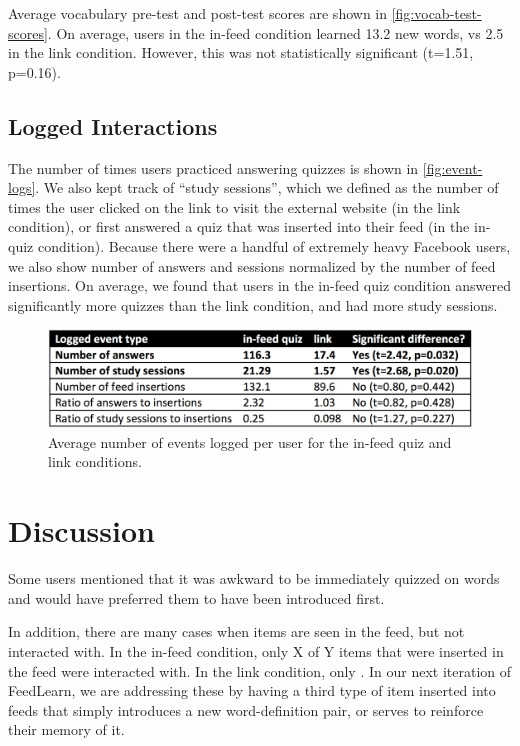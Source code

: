 \documentclass{chi-ext}
\begin{document}
Average vocabulary pre-test and post-test scores are shown in \autoref{fig:vocab-test-scores}. On average, users in the in-feed condition learned 13.2 new words, vs 2.5 in the link condition. However, this was not statistically significant (t=1.51, p=0.16).

\subsection{Logged Interactions}

The number of times users practiced answering quizzes is shown in \autoref{fig:event-logs}. We also kept track of ``study sessions'', which we defined as the number of times the user clicked on the link to visit the external website (in the link condition), or first answered a quiz that was inserted into their feed (in the in-quiz condition). Because there were a handful of extremely heavy Facebook users, we also show number of answers and sessions normalized by the number of feed insertions. On average, we found that users in the in-feed quiz condition answered significantly more quizzes than the link condition, and had more study sessions.

\begin{figure}
\centering
\includegraphics[width=1.0\columnwidth]{event-logs-feedlearn}
\caption{Average number of events logged per user for the in-feed quiz and link conditions.}
\label{fig:event-logs}
\end{figure}

\section{Discussion}

Some users mentioned that it was awkward to be immediately quizzed on words and would have preferred them to have been introduced first. 

In addition, there are many cases when items are seen in the feed, but not interacted with. In the in-feed condition, only X of Y items that were inserted in the feed were interacted with. In the link condition, only . In our next iteration of FeedLearn, we are addressing these by having a third type of item inserted into feeds that simply introduces a new word-definition pair, or serves to reinforce their memory of it.
\end{document}
